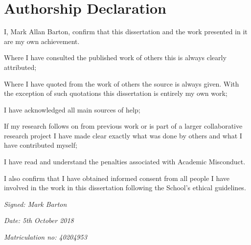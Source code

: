 
\section*{Authorship Declaration}
\vspace{0.5cm}
\begin{flushleft}
I, Mark Allan Barton, confirm that this dissertation and the work presented in it are my own achievement.\newline

Where I have consulted the published work of others this is always clearly attributed;\newline

Where I have quoted from the work of others the source is always given. With the exception of such quotations this dissertation is entirely my own work;\newline

I have acknowledged all main sources of help; \newline

If my research follows on from previous work or is part of a larger collaborative research project I have made clear exactly what was done by others and what I have contributed myself;\newline

I have read and understand the penalties associated with Academic Misconduct.\newline

I also confirm that I have obtained informed consent from all people I have involved in the work in this dissertation following the School's ethical guidelines.\newline
\end{flushleft}

\begin{flushleft} \large
\emph{Signed: Mark Barton} \\
\end{flushleft}

\vspace{.5cm}

\begin{flushleft} \large
\emph{Date: 5th October 2018} \\
\end{flushleft}

\vspace{.5cm}

\begin{flushleft} \large
\emph{Matriculation no: 40204953}  \\
\end{flushleft}